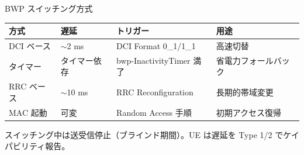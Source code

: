 \begin{frame}{BWP スイッチング方式}
\centering
\begin{tabular}{llll}
\toprule
方式 & 遅延 & トリガー & 用途 \\
\midrule
DCI ベース  & $\sim$2 ms        & DCI Format 0\_1/1\_1     & 高速切替 \\
タイマー    & タイマー依存      & bwp-InactivityTimer 満了 & 省電力フォールバック \\
RRC ベース  & $\sim$10 ms       & RRC Reconfiguration      & 長期的帯域変更 \\
MAC 起動    & 可変              & Random Access 手順       & 初期アクセス復帰 \\
\bottomrule
\end{tabular}

\vspace{0.6em}
{\small スイッチング中は送受信停止（ブラインド期間）。UE は遅延を Type 1/2 でケイパビリティ報告。}
\end{frame}
